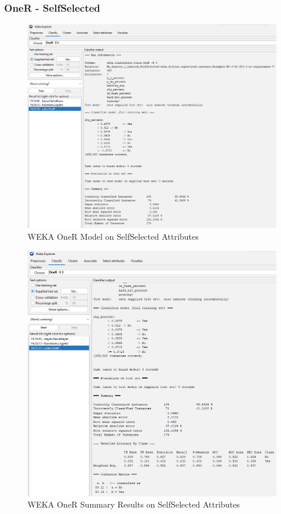 \documentclass[12pt]{article}
\begin{document}
\subsubsection{OneR - SelfSelected}
\begin{figure}[h!]
    \includegraphics[scale=0.4]{./images/SelfSelected/OneR-Model.png}
\centering
    \caption{WEKA OneR Model on SelfSelected Attributes}
\end{figure}
\newpage
\begin{figure}[h!]
    \includegraphics[scale=0.4]{./images/SelfSelected/OneR-Summary.png}
\centering
    \caption{WEKA OneR Summary Results on SelfSelected Attributes}
\end{figure}
\end{document}
